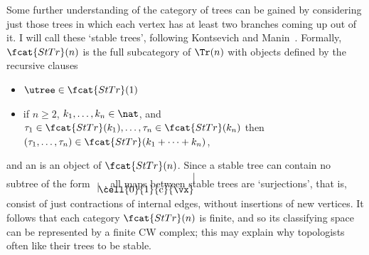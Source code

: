 Some further understanding of the category of trees can be gained by
considering just those trees in which each vertex has at least two branches
coming up out of it.  I will call these `stable trees', following
Kontsevich and Manin~\cite[Definition 6.6.1]{KMGWC}.  Formally,
$\fcat{StTr}(n)$%
% 
% 
is the full subcategory of $\Tr(n)$ with objects defined
by the recursive clauses
%
\begin{itemize}
\item $\utree\in\fcat{StTr}(1)$
\item if $n \geq 2$, $k_1, \ldots, k_n \in \nat$, and $\tau_1 \in
\fcat{StTr}(k_1), \ldots, \tau_n \in \fcat{StTr}(k_n)$ then $(\tau_1,
\ldots, \tau_n) \in \fcat{StTr}(k_1 + \cdots + k_n)$,
\end{itemize}
%
and an %
%
%
is an object of $\fcat{StTr}(n)$.
Since a stable tree can contain no subtree of the form
$
\setlength{\unitlength}{1em}
\begin{array}{c}
\begin{picture}(0,2)(0,0)
\put(0,0){\line(0,1){1}}
\cell{0}{1}{c}{\vx}
\put(0,1){\line(0,1){1}}
\end{picture}
\end{array}
$,
all maps between stable trees are `surjections', that is,
consist of just contractions of internal edges, without insertions of new
vertices.  It follows that each category $\fcat{StTr}(n)$ is finite, and so
its classifying space can be represented by a finite CW complex; this may
explain why topologists often like their trees to be stable.

